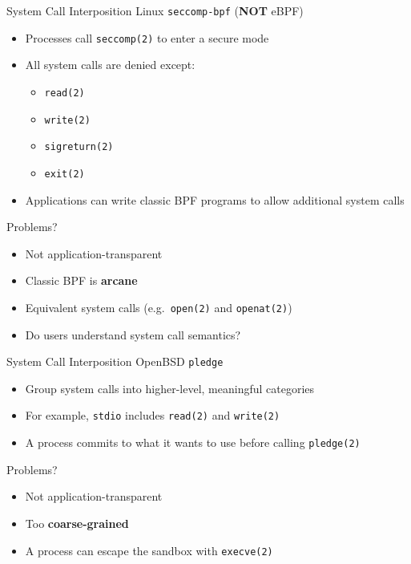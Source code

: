 \documentclass[12pt, dvipsnames, aspectratio=169]{beamer}
\begin{document}
\begin{frame}[c]{System Call Interposition}
Linux \texttt{seccomp-bpf} (\textbf{NOT} eBPF)
\begin{itemize}
    \item Processes call \texttt{seccomp(2)} to enter a secure mode
    \item All system calls are denied except:
    \begin{itemize}
        \item \texttt{read(2)}
        \item \texttt{write(2)}
        \item \texttt{sigreturn(2)}
        \item \texttt{exit(2)}
    \end{itemize}
    \item Applications can write classic BPF programs to allow additional system calls
\end{itemize}
\vfill
Problems?
\begin{itemize}
    \item Not application-transparent
    \item Classic BPF is \textbf{arcane}
    \item Equivalent system calls (e.g.~\texttt{open(2)} and \texttt{openat(2)})
    \item Do users understand system call semantics?
\end{itemize}
\end{frame}

\begin{frame}[c]{System Call Interposition}
OpenBSD \texttt{pledge}
\begin{itemize}
    \item Group system calls into higher-level, meaningful categories
    \item For example, \texttt{stdio} includes \texttt{read(2)} and \texttt{write(2)}
    \item A process commits to what it wants to use before calling \texttt{pledge(2)}
\end{itemize}
\vfill
Problems?
\begin{itemize}
    \item Not application-transparent
    \item Too \textbf{coarse-grained}
    \item A process can escape the sandbox with \texttt{execve(2)}
\end{itemize}
\end{frame}
\end{document}
